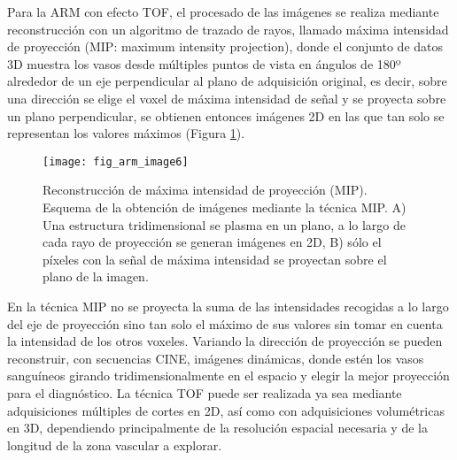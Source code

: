 Para la ARM con efecto TOF, el procesado de las imágenes se realiza mediante reconstrucción con un algoritmo de trazado de rayos, llamado máxima intensidad de proyección (MIP: maximum intensity projection), donde el conjunto de datos 3D muestra los vasos desde múltiples puntos de vista en ángulos de 180º alrededor de un eje perpendicular al plano de adquisición original, es decir, sobre una dirección se elige el voxel de máxima intensidad de señal y se proyecta sobre un plano perpendicular, se obtienen entonces imágenes 2D en las que tan solo se representan los valores máximos (Figura \ref{fig:arm_image6}).


\begin{figure}[htbp]
\begin{figg}
 \texttt{[image: fig\_arm\_image6]}
 \caption{
Reconstrucción de máxima intensidad de proyección (MIP). Esquema de la obtención de imágenes mediante la técnica MIP. A) Una estructura tridimensional se plasma en un plano, a lo largo de cada rayo de proyección se generan imágenes en 2D, B) sólo el píxeles con la señal de máxima intensidad se proyectan sobre el plano de la imagen. 
 }
 \label{fig:arm_image6}
\end{figg}
\end{figure}



En la técnica MIP no se proyecta la suma de las intensidades recogidas a lo largo del eje de proyección sino tan solo el máximo de sus valores sin tomar en cuenta la intensidad de los otros voxeles. Variando la dirección de proyección se pueden reconstruir, con secuencias CINE, imágenes dinámicas, donde estén los vasos sanguíneos girando tridimensionalmente en el espacio y elegir la mejor proyección para el diagnóstico. 
La técnica TOF puede ser realizada ya sea mediante adquisiciones múltiples de cortes en 2D, así como con adquisiciones volumétricas en 3D, dependiendo principalmente de la resolución espacial necesaria y de la longitud de la zona vascular a explorar. 

